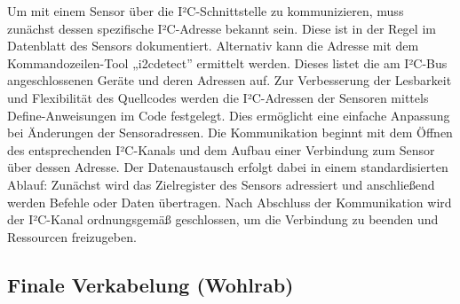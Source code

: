 Um mit einem Sensor über die I²C-Schnittstelle zu kommunizieren, muss zunächst dessen spezifische I²C-Adresse bekannt sein. 
Diese ist in der Regel im Datenblatt des Sensors dokumentiert. 
Alternativ kann die Adresse mit dem Kommandozeilen-Tool „i2cdetect” ermittelt werden. 
Dieses listet die am I²C-Bus angeschlossenen Geräte und deren Adressen auf.
Zur Verbesserung der Lesbarkeit und Flexibilität des Quellcodes werden die I²C-Adressen der Sensoren mittels Define-Anweisungen im Code festgelegt. 
Dies ermöglicht eine einfache Anpassung bei Änderungen der Sensoradressen.
Die Kommunikation beginnt mit dem Öffnen des entsprechenden I²C-Kanals und dem Aufbau einer Verbindung zum Sensor über dessen Adresse. 
Der Datenaustausch erfolgt dabei in einem standardisierten Ablauf: 
Zunächst wird das Zielregister des Sensors adressiert und anschließend werden Befehle oder Daten übertragen. 
Nach Abschluss der Kommunikation wird der I²C-Kanal ordnungsgemäß geschlossen, um die Verbindung zu beenden und Ressourcen freizugeben.

\subsection{Finale Verkabelung (Wohlrab)}


